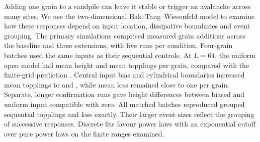 Adding one grain to a sandpile can leave it stable or trigger an avalanche across many sites. We use the two-dimensional Bak--Tang--Wiesenfeld model to examine how these responses depend on input location, dissipative boundaries and event grouping. The primary simulations comprised  measured grain additions across the baseline and three extensions, with five runs per condition. Four-grain batches used the same inputs as their sequential controls. At $L=64$, the uniform open model had mean height  and mean topplings  per grain, compared with the finite-grid prediction . Central input bias and cylindrical boundaries increased mean topplings to  and , while mean loss remained close to one per grain. Separate, longer confirmation runs gave height differences between biased and uniform input compatible with zero. All  matched batches reproduced grouped sequential topplings and loss exactly. Their larger event sizes reflect the grouping of successive responses. Discrete fits favour power laws with an exponential cutoff over pure power laws on the finite ranges examined.
